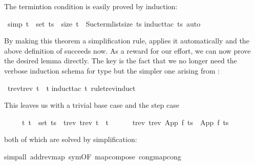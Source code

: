 %
\begin{isabellebody}%
\def\isabellecontext{Nested{\isadigit{2}}}%
%
\begin{isamarkuptext}%
\noindent
The termintion condition is easily proved by induction:%
\end{isamarkuptext}%
\ {\isacharbrackleft}simp{\isacharbrackright}{\isacharcolon}\ {\isachardoublequote}t\ {\isasymin}\ set\ ts\ {\isasymlongrightarrow}\ size\ t\ {\isacharless}\ Suc{\isacharparenleft}term{\isacharunderscore}list{\isacharunderscore}size\ ts{\isacharparenright}{\isachardoublequote}\isanewline
{}induct{\isacharunderscore}tac\ ts{\isacharcomma}\ auto{\isacharparenright}%
\begin{isamarkuptext}%
\noindent
By making this theorem a simplification rule, 
applies it automatically and the above definition of 
succeeds now. As a reward for our effort, we can now prove the desired
lemma directly. The key is the fact that we no longer need the verbose
induction schema for type  but the simpler one arising from
:%
\end{isamarkuptext}%
\ {\isachardoublequote}trev{\isacharparenleft}trev\ t{\isacharparenright}\ {\isacharequal}\ t{\isachardoublequote}\isanewline
{}induct{\isacharunderscore}tac\ t\ rule{\isacharcolon}trev{\isachardot}induct{\isacharparenright}%
\begin{isamarkuptxt}%
\noindent
This leaves us with a trivial base case  and the step case
\begin{isabelle}%
\ \ \ \ \ {\isasymforall}t{\isachardot}\ t\ {\isasymin}\ set\ ts\ {\isasymlongrightarrow}\ trev\ {\isacharparenleft}trev\ t{\isacharparenright}\ {\isacharequal}\ t\ {\isasymLongrightarrow}\isanewline
\ \ \ \ \ trev\ {\isacharparenleft}trev\ {\isacharparenleft}App\ f\ ts{\isacharparenright}{\isacharparenright}\ {\isacharequal}\ App\ f\ ts%
\end{isabelle}
both of which are solved by simplification:%
\end{isamarkuptxt}%
simp{\isacharunderscore}all\ add{\isacharcolon}rev{\isacharunderscore}map\ sym{\isacharbrackleft}OF\ map{\isacharunderscore}compose{\isacharbrackright}\ cong{\isacharcolon}map{\isacharunderscore}cong{\isacharparenright}%
\begin{isamarkuptext}%

\end{isamarkuptext}
\end{isabellebody}

